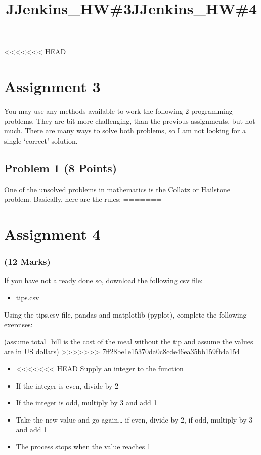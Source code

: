 \documentclass[11pt]{article}
\title{JJenkins\_HW\#3}
\title{JJenkins\_HW\#4}
\providecommand{\tightlist}{%
      \setlength{\itemsep}{0pt}\setlength{\parskip}{0pt}}
\begin{document}
    
    
    \maketitle
    
    

    
<<<<<<< HEAD
    \hypertarget{assignment-3}{%
\section{Assignment 3}\label{assignment-3}}

You may use any methods available to work the following 2 programming
problems. They are bit more challenging, than the previous assignments,
but not much. There are many ways to solve both problems, so I am not
looking for a single `correct' solution.

\hypertarget{problem-1-8-points}{%
\subsection{Problem 1 (8 Points)}\label{problem-1-8-points}}

One of the unsolved problems in mathematics is the Collatz or Hailstone
problem. Basically, here are the rules:
=======
    \hypertarget{assignment-4}{%
\section{Assignment 4}\label{assignment-4}}

\hypertarget{marks}{%
\subsubsection{(12 Marks)}\label{marks}}

If you have not already done so, download the following csv file:

\begin{itemize}
\tightlist
\item
  \href{https://www.dropbox.com/s/br6p2brp54cjpla/tips.csv?dl=1}{tips.csv}
\end{itemize}

Using the tips.csv file, pandas and matplotlib (pyplot), complete the
following exercises:

(assume total\_bill is the cost of the meal without the tip and assume
the values are in US dollars)
>>>>>>> 7ff28be1e15370da0c8cde46ea35bb159fb4a154

\begin{itemize}
\tightlist
\item
<<<<<<< HEAD
  Supply an integer to the function
\item
  If the integer is even, divide by 2
\item
  If the integer is odd, multiply by 3 and add 1
\item
  Take the new value and go again\ldots{} if even, divide by 2, if odd,
  multiply by 3 and add 1
\item
  The process stops when the value reaches 1
\end{itemize}
\end{document}
